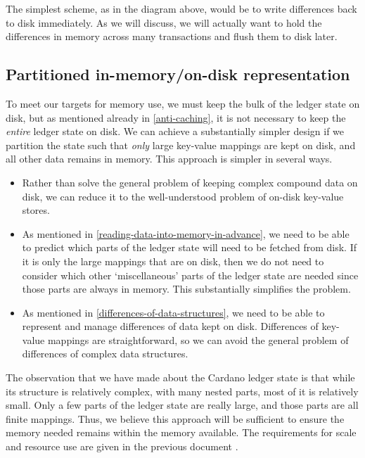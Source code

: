 \documentclass[11pt,a4paper]{article}
\begin{document}
The simplest scheme, as in the diagram above, would be to write differences
back to disk immediately. As we will discuss, we will actually want to hold
the differences in memory across many transactions and flush them to disk later.

\subsection{Partitioned in-memory/on-disk representation}
\label{partitioned-representation}

To meet our targets for memory use, we must keep the bulk of the ledger state on
disk, but as mentioned already in \cref{anti-caching}, it is not necessary to
keep the \emph{entire} ledger state on disk. We can achieve a substantially
simpler design if we partition the state such that \emph{only} large key-value
mappings are kept on disk, and all other data remains in memory. This approach
is simpler in several ways.
\begin{itemize}
\item Rather than solve the general problem of keeping complex compound data on
      disk, we can reduce it to the well-understood problem of on-disk
      key-value stores.
\item As mentioned in \cref{reading-data-into-memory-in-advance}, we need to be
      able to predict which parts of the ledger state will need to be fetched
      from disk. If it is only the large mappings that are on disk, then we do
      not need to consider which other `miscellaneous' parts of the ledger
      state are needed since those parts are always in memory. This
      substantially simplifies the problem.
\item As mentioned in \cref{differences-of-data-structures}, we need to be able
      to represent and manage differences of data kept on disk. Differences of
      key-value mappings are straightforward, so we can avoid the general
      problem of differences of complex data structures.
\end{itemize}

The observation that we have made about the Cardano ledger state is that while
its structure is relatively complex, with many nested parts, most of it is
relatively small. Only a few parts of the ledger state are really large, and
those parts are all finite mappings. Thus, we believe this approach will be
sufficient to ensure the memory needed remains within the memory available. The
requirements for scale and resource use are given in the previous document
\citep[Section 3]{utxo-db}.
\end{document}
